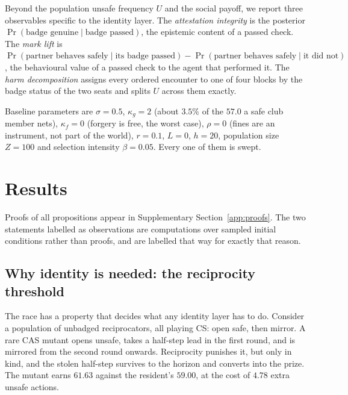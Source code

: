 \documentclass[preprint,12pt]{elsarticle}
\theoremstyle{plain}
\theoremstyle{definition}
\newcommand{\CS}{\textsf{CS}}
\newcommand{\CAS}{\textsf{CAS}}
\begin{document}
Beyond the population unsafe frequency $U$ and the social payoff, we report
three observables specific to the identity layer. The \emph{attestation
integrity} is the posterior $\Pr(\text{badge genuine} \mid \text{badge
passed})$, the epistemic content of a passed check. The \emph{mark lift} is
$\Pr(\text{partner behaves safely} \mid \text{its badge passed}) -
\Pr(\text{partner behaves safely} \mid \text{it did not})$, the behavioural
value of a passed check to the agent that performed it. The \emph{harm
decomposition} assigns every ordered encounter to one of four blocks by the
badge status of the two seats and splits $U$ across them exactly.

Baseline parameters are $\sigma = 0.5$, $\kappa_g = 2$ (about $3.5\%$ of the
$57.0$ a safe club member nets), $\kappa_f = 0$ (forgery is free, the worst
case), $\rho = 0$ (fines are an instrument, not part of the world), $r = 0.1$,
$L = 0$, $h = 20$, population size $Z = 100$ and selection intensity
$\beta = 0.05$. Every one of them is swept.



\section{Results}
\label{sec:results}

Proofs of all propositions appear in Supplementary Section~\ref{app:proofs}. The two
statements labelled as observations are computations over sampled initial
conditions rather than proofs, and are labelled that way for exactly that
reason.

\subsection{Why identity is needed: the reciprocity threshold}
\label{sec:reciprocity}

The race has a property that decides what any identity layer has to do. Consider
a population of unbadged reciprocators, all playing \CS{}: open safe, then
mirror. A rare \CAS{} mutant opens unsafe, takes a half-step lead in the first
round, and is mirrored from the second round onwards. Reciprocity punishes it,
but only in kind, and the stolen half-step survives to the horizon and converts
into the prize. The mutant earns $61.63$ against the resident's $59.00$, at the
cost of $4.78$ extra unsafe actions.
\end{document}
